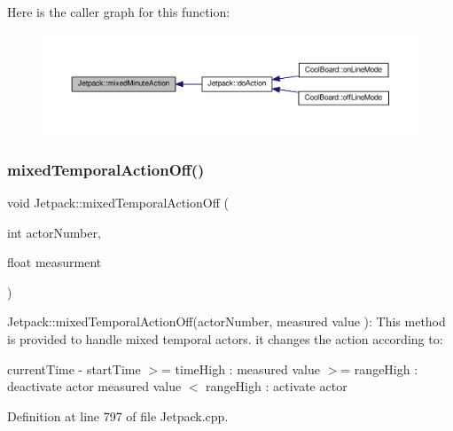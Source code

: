Here is the caller graph for this function\+:
\nopagebreak
\begin{figure}[H]
\begin{center}
\leavevmode
\includegraphics[width=350pt]{df/d1d/class_jetpack_acf8ed1fb594b9e8e224f4ed872a8e093_icgraph}
\end{center}
\end{figure}
\mbox{\label{class_jetpack_af2f567ef6311a8fc2f7bb948837667b7}} 
\subsubsection{\texorpdfstring{mixed\+Temporal\+Action\+Off()}{mixedTemporalActionOff()}}
{\footnotesize\ttfamily void Jetpack\+::mixed\+Temporal\+Action\+Off (\begin{DoxyParamCaption}\item[{int}]{actor\+Number,  }\item[{float}]{measurment }\end{DoxyParamCaption})}

Jetpack\+::mixed\+Temporal\+Action\+Off(actor\+Number, measured value )\+: This method is provided to handle mixed temporal actors. it changes the action according to\+:

current\+Time -\/ start\+Time $>$= time\+High \+: measured value $>$= range\+High \+: deactivate actor measured value $<$ range\+High \+: activate actor 

Definition at line 797 of file Jetpack.\+cpp.


